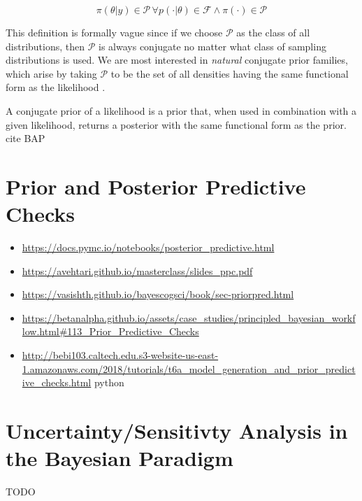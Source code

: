 \begin{equation}
    \pi \left(\theta | y \right) \in \mathcal{P} \, \forall p \left(\cdot | \theta \right) \in \mathcal{F} \land \pi (\cdot) \in \mathcal{P}
\end{equation}

This definition is formally vague since if we choose $\mathcal{P}$ as the class of all distributions, then $\mathcal{P}$ is always conjugate no matter what class of sampling distributions is used. We are most interested in \textit{natural} conjugate prior families, which arise by taking $\mathcal{P}$ to be the set of all densities having the same functional form as the likelihood \cite{ABC_ch1}.

A conjugate prior of a likelihood is a prior that, when used in combination with a given likelihood, returns a posterior with the same functional form as the prior. cite BAP

\section{Prior and Posterior Predictive Checks}

\begin{itemize}
    \item \url{https://docs.pymc.io/notebooks/posterior_predictive.html}
    \item \url{https://avehtari.github.io/masterclass/slides_ppc.pdf}
    \item \url{https://vasishth.github.io/bayescogsci/book/sec-priorpred.html}
    \item \url{https://betanalpha.github.io/assets/case_studies/principled_bayesian_workflow.html#113_Prior_Predictive_Checks}
    \item \url{http://bebi103.caltech.edu.s3-website-us-east-1.amazonaws.com/2018/tutorials/t6a_model_generation_and_prior_predictive_checks.html} python
\end{itemize}

\section{Uncertainty/Sensitivty Analysis in the Bayesian Paradigm}

TODO

